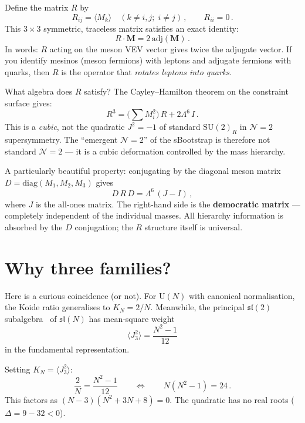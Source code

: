 \documentclass[11pt,a4paper]{article}
\begin{document}
Define the matrix $R$ by
\begin{equation}
  R_{ij} = \langle M_k \rangle
  \quad (k \neq i, j;\; i \neq j)\,,\qquad
  R_{ii} = 0\,.
\end{equation}
This $3 \times 3$ symmetric, traceless matrix satisfies an
exact identity:
\begin{equation}
  R \cdot \mathbf{M} = 2\,\mathrm{adj}(\mathbf{M})\,.
\end{equation}
In words: $R$ acting on the meson VEV vector gives twice the
adjugate vector.
If you identify mesinos (meson fermions) with leptons and
adjugate fermions with quarks, then $R$ is the operator that
\emph{rotates leptons into quarks}.

What algebra does $R$ satisfy?
The Cayley--Hamilton theorem on the constraint surface gives:
\begin{equation}
  R^3 = \bigl(\textstyle\sum M_i^2\bigr)\,R + 2\Lambda^6\,I\,.
\end{equation}
This is a \emph{cubic}, not the quadratic $J^2 = -1$ of
standard $\mathrm{SU}(2)_R$ in $\mathcal{N} = 2$ supersymmetry.
The ``emergent $\mathcal{N} = 2$'' of the sBootstrap is
therefore not standard $\mathcal{N} = 2$ --- it is a cubic
deformation controlled by the mass hierarchy.

A particularly beautiful property: conjugating by the diagonal
meson matrix $D = \mathrm{diag}(M_1, M_2, M_3)$ gives
\begin{equation}
  D\,R\,D = \Lambda^6\,(J - I)\,,
\end{equation}
where $J$ is the all-ones matrix. The right-hand side is the
\textbf{democratic matrix} --- completely independent of the
individual masses. All hierarchy information is absorbed by
the $D$ conjugation; the $R$ structure itself is universal.


\section{Why three families?}

Here is a curious coincidence (or not).
For $\mathrm{U}(N)$ with canonical normalisation, the Koide ratio
generalises to $K_N = 2/N$.
Meanwhile, the principal $\mathfrak{sl}(2)$
subalgebra~\cite{Kostant:1959} of $\mathfrak{sl}(N)$ has mean-square
weight
\begin{equation}
  \langle J_3^2 \rangle = \frac{N^2 - 1}{12}
\end{equation}
in the fundamental representation.

Setting $K_N = \langle J_3^2 \rangle$:
\begin{equation}
  \frac{2}{N} = \frac{N^2 - 1}{12}
  \qquad\Longleftrightarrow\qquad
  N(N^2 - 1) = 24\,.
\end{equation}
This factors as $(N-3)(N^2 + 3N + 8) = 0$.
The quadratic has no real roots ($\Delta = 9 - 32 < 0$).
\end{document}
